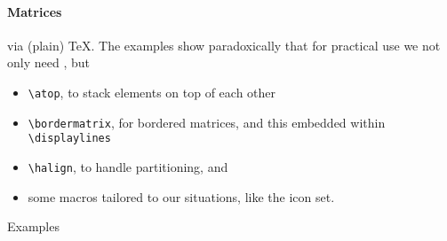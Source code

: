 \paragraph*{Matrices}via (plain) \TeX.
The examples show paradoxically that for practical use
we not only need , but
\begin{itemize}
\item \verb|\atop|, to stack elements on top of each other
\item \verb|\bordermatrix|, for bordered matrices, and this embedded within
      \verb|\displaylines|
\item \verb|\halign|, to handle partitioning, and
\item some macros tailored to our situations, like the icon set.
\end{itemize}
\noindent Examples
